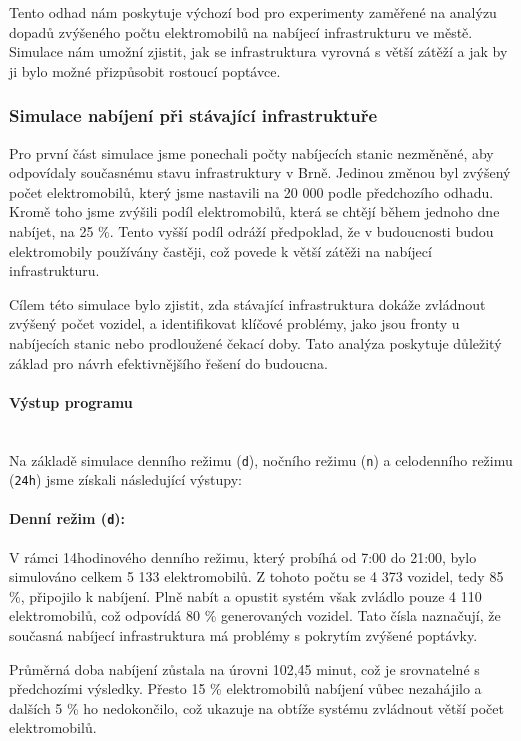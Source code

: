 \documentclass[a4paper,11pt]{article}
\begin{document}
Tento odhad nám poskytuje výchozí bod pro experimenty zaměřené na analýzu dopadů zvýšeného počtu elektromobilů na nabíjecí infrastrukturu ve městě. Simulace nám umožní zjistit, jak se infrastruktura vyrovná s větší zátěží a jak by ji bylo možné přizpůsobit rostoucí poptávce.

\subsubsection{Simulace nabíjení při stávající infrastruktuře}
Pro první část simulace jsme ponechali počty nabíjecích stanic nezměněné, aby odpovídaly současnému stavu infrastruktury v Brně. Jedinou změnou byl zvýšený počet elektromobilů, který jsme nastavili na 20 000 podle předchozího odhadu. Kromě toho jsme zvýšili podíl elektromobilů, která se chtějí během jednoho dne nabíjet, na 25 \%. Tento vyšší podíl odráží předpoklad, že v budoucnosti budou elektromobily používány častěji, což povede k větší zátěži na nabíjecí infrastrukturu.

Cílem této simulace bylo zjistit, zda stávající infrastruktura dokáže zvládnout zvýšený počet vozidel, a identifikovat klíčové problémy, jako jsou fronty u nabíjecích stanic nebo prodloužené čekací doby. Tato analýza poskytuje důležitý základ pro návrh efektivnějšího řešení do budoucna.


\paragraph{Výstup programu\\\\}
Na základě simulace denního režimu (\texttt{d}), nočního režimu (\texttt{n}) a celodenního režimu (\texttt{24h}) jsme získali následující výstupy:

\paragraph{Denní režim (\texttt{d}):} 
V rámci 14hodinového denního režimu, který probíhá od 7:00 do 21:00, bylo simulováno celkem 5 133 elektromobilů. Z tohoto počtu se 4 373 vozidel, tedy 85 \%, připojilo k nabíjení. Plně nabít a opustit systém však zvládlo pouze 4 110 elektromobilů, což odpovídá 80 \% generovaných vozidel. Tato čísla naznačují, že současná nabíjecí infrastruktura má problémy s pokrytím zvýšené poptávky.

Průměrná doba nabíjení zůstala na úrovni 102,45 minut, což je srovnatelné s předchozími výsledky. Přesto 15 \% elektromobilů nabíjení vůbec nezahájilo a dalších 5 \% ho nedokončilo, což ukazuje na obtíže systému zvládnout větší počet elektromobilů.
\end{document}
